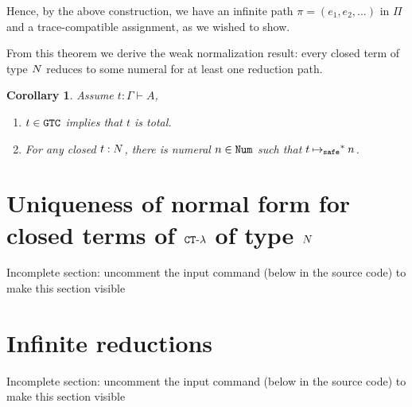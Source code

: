 \documentclass{article}
\newtheorem{corollary}[theorem]{Corollary}
\newenvironment{proof}[1][Proof]{\begin{trivlist}
\item[\hskip \labelsep {\bfseries #1}]}{\end{trivlist}}
\begin{document}
\begin{proof}
\begin{enumerate}
\end{enumerate}

  Hence, by the above construction, we have an infinite path $\pi = (e_1,e_2,\ldots)$ in $\Pi$
 and a trace-compatible assignment, as we wished to show.

  
\end{proof}

From this theorem we derive the weak normalization result: 
every closed term of type ${N}$ reduces to some numeral for at least
one reduction path. 

\begin{corollary}
Assume  $t: \Gamma\vdash A$,
\begin {enumerate}
\item
 $t \in {\tt GTC}$ implies that $t$ is total.
\item
  For any closed $t:{N}$, there is numeral $n\in{\tt Num}$ such that $t\mathbin{{\mapsto}_{\tiny \tt safe}}^* n$. 
\end{enumerate}
\end{corollary}




\section{Uniqueness of normal form for closed terms of ${ {\tt CT} \mbox{-} \lambda}$ of type ${N}$}
\label{section-uniqueness-normal-form}
{Incomplete section: uncomment the input command (below in the source code) to make this section visible}
%


\section{Infinite reductions}
\label{section-infinite-reductions}
{Incomplete section: uncomment the input command (below in the source code) to make this section visible}
%
\end{document}

